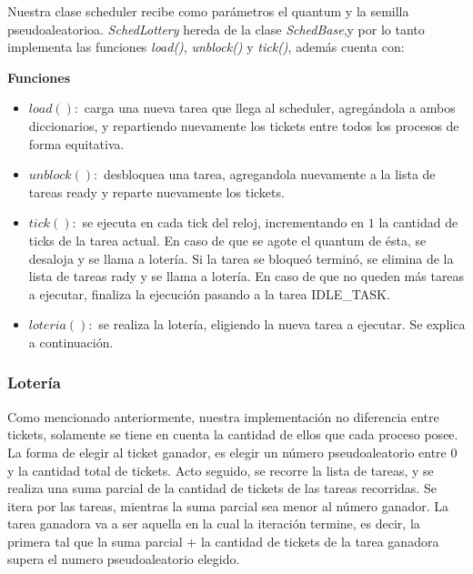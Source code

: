 \vspace{2mm}

Nuestra clase scheduler recibe como par\'ametros el quantum y la semilla pseudoaleatorioa. \textit{SchedLottery} hereda de la clase \textit{SchedBase},y por lo tanto implementa las funciones \textit{load()}, \textit{unblock()} y \textit{tick()}, adem\'as cuenta con:

\vspace{2mm}

\textbf{Funciones}

\begin{itemize}

\item $load():$ carga una nueva tarea que llega al scheduler, agreg\'andola a ambos diccionarios, y repartiendo nuevamente los tickets entre todos los procesos de forma equitativa.

\item $unblock(): $ desbloquea una tarea, agregandola nuevamente a la lista de tareas ready y reparte nuevamente los tickets.

\item $tick(): $ se ejecuta en cada tick del reloj, incrementando en $1$ la cantidad de ticks de la tarea actual. En caso de que se agote el quantum de \'esta, se desaloja y se llama a loter\'ia. Si la tarea se bloque\'o termin\'o, se elimina de la lista de tareas rady y se llama a loter\'ia. En caso de que no queden m\'as tareas a ejecutar, finaliza la ejecuci\'on pasando a la tarea IDLE\_TASK.
\item $loteria(): $ se realiza la loter\'ia, eligiendo la nueva tarea a ejecutar. Se explica a continuaci\'on.

\end{itemize}

\subsubsection{Loter\'ia}

Como mencionado anteriormente, nuestra implementaci\'on no diferencia entre tickets, solamente se tiene en cuenta la cantidad de ellos que cada proceso posee. La forma de elegir al ticket ganador, es elegir un n\'umero pseudoaleatorio entre 0 y la cantidad total de tickets. Acto seguido, se recorre la lista de tareas, y se realiza una suma parcial de la cantidad de tickets de las tareas recorridas. Se itera por las tareas, mientras la suma parcial sea menor al n\'umero ganador. La tarea ganadora va a ser aquella en la cual la iteraci\'on termine, es decir, la primera tal que la suma parcial $+$ la cantidad de tickets de la tarea ganadora supera el numero pseudoaleatorio elegido.

